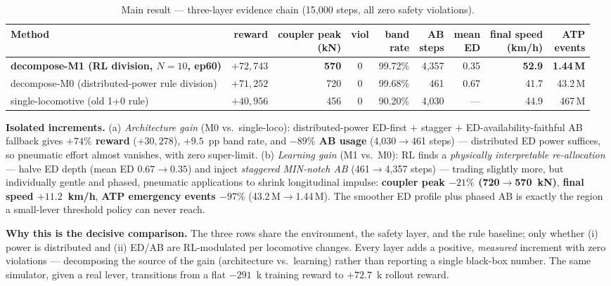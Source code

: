 \documentclass[conference]{IEEEtran}
\begin{document}
\begin{table}[!t]
\centering
\caption{Main result --- three-layer evidence chain (15{,}000 steps, all zero
safety violations).}
\label{tab:main}
\begin{tabular}{@{}l r r c r r r r r@{}}
\toprule
Method & reward & \makecell[c]{coupler peak\\(kN)} & viol & \makecell[c]{band\\rate} & \makecell[c]{AB\\steps} & \makecell[c]{mean\\ED} & \makecell[c]{final speed\\(km/h)} & \makecell[c]{ATP\\events}\\
\midrule
\textbf{decompose-M1 (RL division, $N{=}10$, ep60)} & \textbf{$+72{,}743$} & \textbf{570} & 0 & 99.72\% & 4{,}357 & 0.35 & \textbf{52.9} & \textbf{1.44\,M}\\
decompose-M0 (distributed-power rule division) & $+71{,}252$ & 720 & 0 & 99.68\% & 461 & 0.67 & 41.7 & 43.2\,M\\
single-locomotive (old 1+0 rule) & $+40{,}956$ & 456 & 0 & 90.20\% & 4{,}030 & --- & 44.9 & 467\,M\\
\bottomrule
\end{tabular}
\end{table}

\textbf{Isolated increments.}
(a) \emph{Architecture gain} (M0 vs.\ single-loco): distributed-power
ED-first $+$ stagger $+$ ED-availability-faithful AB fallback gives
\textbf{$+74\%$ reward} ($+30{,}278$), $+9.5$~pp band rate, and \textbf{$-89\%$
AB usage} (4{,}030$\rightarrow$461 steps) --- distributed ED power suffices, so
pneumatic effort almost vanishes, with zero super-limit.
(b) \emph{Learning gain} (M1 vs.\ M0): RL finds a \emph{physically
interpretable re-allocation} --- halve ED depth (mean ED $0.67\rightarrow
0.35$) and inject \emph{staggered MIN-notch AB} (461$\rightarrow$4{,}357 steps)
--- trading slightly more, but individually gentle and phased, pneumatic
applications to shrink longitudinal impulse: \textbf{coupler peak $-21\%$
(720$\rightarrow$570~kN)}, \textbf{final speed $+11.2$~km/h}, \textbf{ATP
emergency events $-97\%$} (43.2\,M$\rightarrow$1.44\,M). The smoother ED
profile plus phased AB is exactly the region a small-lever threshold policy can
never reach.

\textbf{Why this is the decisive comparison.} The three rows share the
environment, the safety layer, and the rule baseline; only whether (i) power is
distributed and (ii) ED/AB are RL-modulated per locomotive changes. Every layer
adds a positive, \emph{measured} increment with zero violations ---
decomposing the source of the gain (architecture vs.\ learning) rather than
reporting a single black-box number. The same simulator, given a real lever,
transitions from a flat $-291$~k training reward to $+72.7$~k rollout reward.
\end{document}
